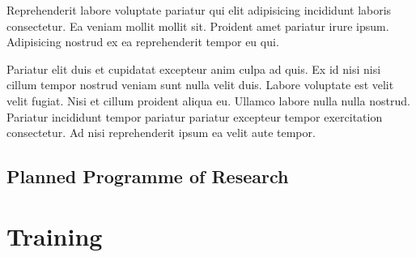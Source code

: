 \documentclass[a4paper, notitlepage, 11pt]{article}
\begin{document}
Reprehenderit labore voluptate pariatur qui elit adipisicing incididunt laboris consectetur. Ea veniam mollit mollit sit. Proident amet pariatur irure ipsum. Adipisicing nostrud ex ea reprehenderit tempor eu qui.

Pariatur elit duis et cupidatat excepteur anim culpa ad quis. Ex id nisi nisi cillum tempor nostrud veniam sunt nulla velit duis. Labore voluptate est velit velit fugiat. Nisi et cillum proident aliqua eu. Ullamco labore nulla nulla nostrud. Pariatur incididunt tempor pariatur pariatur excepteur tempor exercitation consectetur. Ad nisi reprehenderit ipsum ea velit aute tempor.



\subsection{Planned Programme of Research}



\section{Training}




\clearpage
\appendix 
{}

\end{document}
